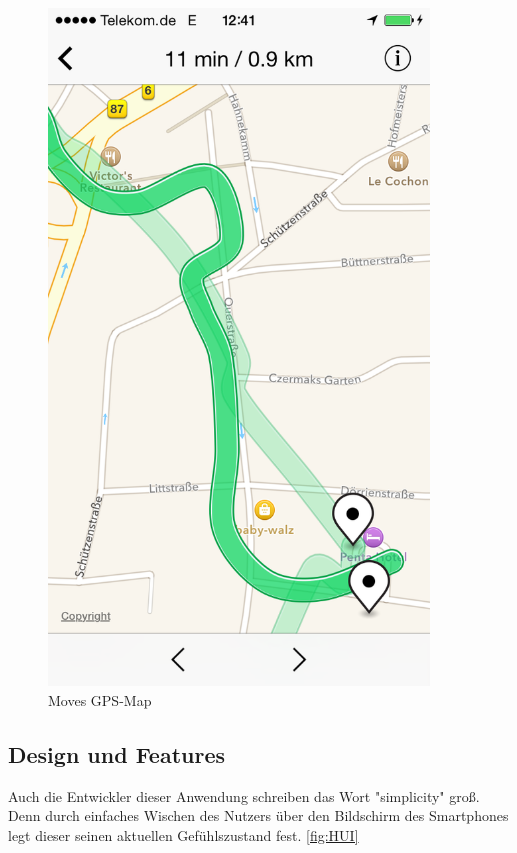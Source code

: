 \begin{figure}
\centering
\includegraphics[width=0.9\textwidth]{images/moves-app-map.PNG}
\caption{Moves GPS-Map \cite{fig:GPS-Map}}
\label{fig:GPS-Map}
\end{figure}

\subsection{Design und Features}
\label{ch:Apps:sec:Moves:subsec:DuFe}

Auch die Entwickler dieser Anwendung schreiben das Wort "simplicity" groß. 
Denn durch einfaches Wischen des Nutzers über den Bildschirm des Smartphones legt dieser seinen aktuellen Gefühlszustand fest.
\ref{fig:HUI}

